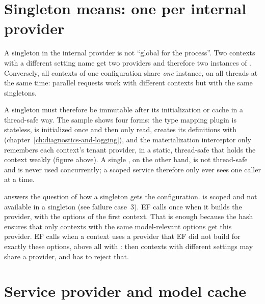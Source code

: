 \section{Singleton means: one per internal provider}

A singleton in the internal provider is not “global for the process”. Two contexts with a
different setting name get two providers and therefore two instances of
. Conversely, all contexts of one
configuration share \emph{one} instance, on all threads at the same time: parallel requests
work with different contexts but with the same singletons.

A singleton must therefore be immutable after its initialization or cache in a thread-safe
way. The sample shows four forms: the type mapping plugin is stateless,
 is initialized once and then only
read,  creates its definitions
with 
(chapter~\ref{ch:diagnostics-and-logging}), and the materialization interceptor only
remembers each context's tenant provider, in a static, thread-safe
 that holds the context weakly
(figure above). A single , on the
other hand, is not thread-safe and is never used concurrently; a scoped service therefore
only ever sees one caller at a time.

 answers the question of how a singleton gets the
configuration.  is scoped and not
available in a singleton (see failure case~3). EF calls  once when it
builds the provider, with the options of the first context. That is enough because the hash
ensures that only contexts with the same model-relevant options get this provider. EF calls
 when a context uses a provider that EF did not build for exactly these
options, above all with :
then contexts with different settings may share a provider, and  has to
reject that.

\section{Service provider and model cache}

